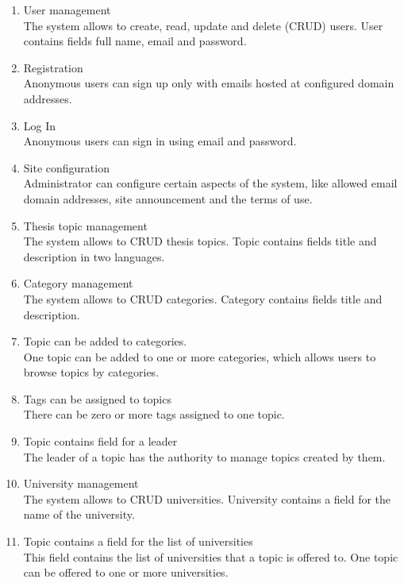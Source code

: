 \begin{enumerate}
    \item User management\\
    The system allows to create, read, update and delete (CRUD) users. User contains fields full name, email and password.

    \item Registration\\
    Anonymous users can sign up only with emails hosted at configured domain addresses.

    \item Log In\\
    Anonymous users can sign in using email and password.

    \item Site configuration\\
    Administrator can configure certain aspects of the system, like allowed email domain addresses, site announcement and the terms of use.

    \item Thesis topic management\\
    The system allows to CRUD thesis topics. Topic contains fields title and description in two languages.

    \item Category management\\
    The system allows to CRUD categories. Category contains fields title and description.

    \item Topic can be added to categories.\\
    One topic can be added to one or more categories, which allows users to browse topics by categories.

    \item Tags can be assigned to topics\\
    There can be zero or more tags assigned to one topic.

    \item Topic contains field for a leader\\
    The leader of a topic has the authority to manage topics created by them.

    \item University management\\
    The system allows to CRUD universities. University contains a field for the name of the university.

    \item Topic contains a field for the list of universities\\
    This field contains the list of universities that a topic is offered to. One topic can be offered to one or more universities.


\end{enumerate}
